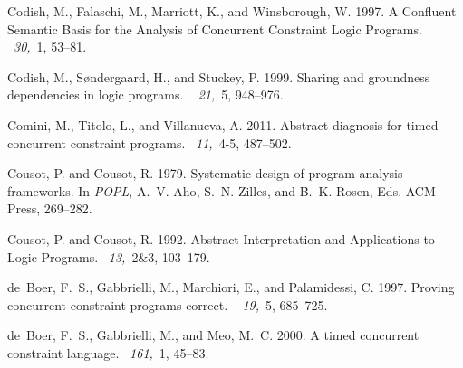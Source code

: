 \documentclass{tlp}
\begin{document}
\begin{thebibliography}{}
{\sc Codish, M.}, {\sc Falaschi, M.}, {\sc Marriott, K.}, {\sc and} {\sc
  Winsborough, W.} 1997.
\newblock A {C}onfluent {S}emantic {B}asis for the {A}nalysis of {C}oncurrent
  {C}onstraint {L}ogic {P}rograms.
~{\em 30,\/}~1, 53--81.

{\sc Codish, M.}, {\sc S{\o}ndergaard, H.}, {\sc and} {\sc Stuckey, P.} 1999.
\newblock Sharing and groundness dependencies in logic programs.
~{\em
  21,\/}~5, 948--976.

{\sc Comini, M.}, {\sc Titolo, L.}, {\sc and} {\sc Villanueva, A.} 2011.
\newblock Abstract diagnosis for timed concurrent constraint programs.
~{\em 11,\/}~4-5, 487--502.

{\sc Cousot, P.} {\sc and} {\sc Cousot, R.} 1979.
\newblock Systematic design of program analysis frameworks.
\newblock In {\em POPL}, {A.~V. Aho}, {S.~N. Zilles}, {and} {B.~K. Rosen}, Eds.
  ACM Press, 269--282.

{\sc Cousot, P.} {\sc and} {\sc Cousot, R.} 1992.
\newblock Abstract {I}nterpretation and {A}pplications to {L}ogic {P}rograms.
~{\em 13,\/}~2\&3, 103--179.

{\sc de~Boer, F.~S.}, {\sc Gabbrielli, M.}, {\sc Marchiori, E.}, {\sc and} {\sc
  Palamidessi, C.} 1997.
\newblock Proving concurrent constraint programs correct.
~{\em
  19,\/}~5, 685--725.

{\sc de~Boer, F.~S.}, {\sc Gabbrielli, M.}, {\sc and} {\sc Meo, M.~C.} 2000.
\newblock A timed concurrent constraint language.
~{\em 161,\/}~1, 45--83.


\end{thebibliography}
\end{document}

